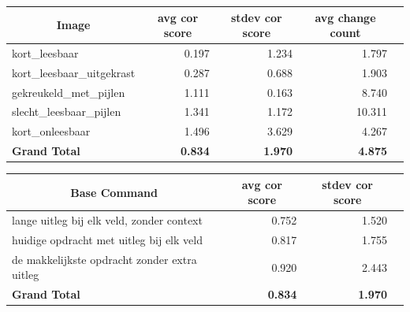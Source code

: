 \documentclass[12pt]{article}
\begin{document}
\noindent\begin{table}[h]\begin{tabularx}{\textwidth}{X *4{r}}
\toprule
\multicolumn{1}{c}{\textbf{Image}} & \multicolumn{1}{c}{\textbf{avg cor score}} & \multicolumn{1}{c}{\textbf{stdev cor score}} & \multicolumn{1}{c}{\textbf{avg change count}} \\
\midrule
kort\_leesbaar & 0.197 & 1.234 & 1.797 \\
kort\_leesbaar\_uitgekrast & 0.287 & 0.688 & 1.903 \\
gekreukeld\_met\_pijlen & 1.111 & 0.163 & 8.740 \\
slecht\_leesbaar\_pijlen & 1.341 & 1.172 & 10.311 \\
kort\_onleesbaar & 1.496 & 3.629 & 4.267 \\
\midrule
\textbf{Grand Total} & \textbf{0.834} & \textbf{1.970} & \textbf{4.875} \\
\bottomrule
\end{tabularx}%
\end{table}





\noindent\begin{table}[h]\begin{tabularx}{\textwidth}{X *3{r}}
\toprule
\multicolumn{1}{c}{\textbf{Base Command}} & \multicolumn{1}{c}{\textbf{avg cor score}} & \multicolumn{1}{c}{\textbf{stdev cor score}} \\
\midrule
lange uitleg bij elk veld, zonder context & 0.752 & 1.520 \\
huidige opdracht met uitleg bij elk veld & 0.817 & 1.755 \\
de makkelijkste opdracht zonder extra uitleg & 0.920 & 2.443 \\
\midrule
\textbf{Grand Total} & \textbf{0.834} & \textbf{1.970} \\
\bottomrule
\end{tabularx}%
\end{table}
\end{document}
